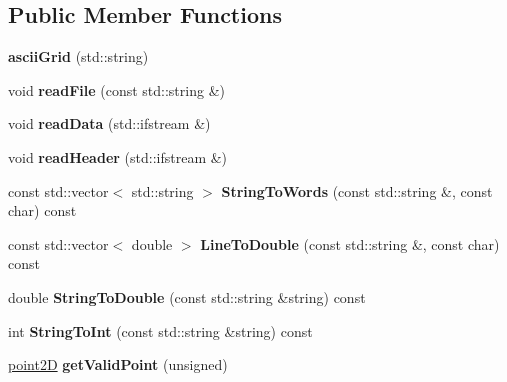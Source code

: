 \subsection*{Public Member Functions}
\begin{DoxyCompactItemize}
\item 
\mbox{\label{classasciiGrid_af8550fe183b2826823cab513878dcc8d}} 
{\bfseries ascii\+Grid} (std\+::string)
\item 
\mbox{\label{classasciiGrid_af009652a3b09761f42af9b6a9510aca7}} 
void {\bfseries read\+File} (const std\+::string \&)
\item 
\mbox{\label{classasciiGrid_a3f76f212cbd1eafd58da22623d49f44c}} 
void {\bfseries read\+Data} (std\+::ifstream \&)
\item 
\mbox{\label{classasciiGrid_aa8f140d48bc75fd0cb54c2e092ae81a6}} 
void {\bfseries read\+Header} (std\+::ifstream \&)
\item 
\mbox{\label{classasciiGrid_a9d4130b7ef3a98f9ece49cdf03f63849}} 
const std\+::vector$<$ std\+::string $>$ {\bfseries String\+To\+Words} (const std\+::string \&, const char) const
\item 
\mbox{\label{classasciiGrid_ace6a959d265f1f6da26f1aaf5721efe5}} 
const std\+::vector$<$ double $>$ {\bfseries Line\+To\+Double} (const std\+::string \&, const char) const
\item 
\mbox{\label{classasciiGrid_a0ec01a9678211fe765761a9c144a99f7}} 
double {\bfseries String\+To\+Double} (const std\+::string \&string) const
\item 
\mbox{\label{classasciiGrid_aea0714b6499575ddadc02f5ab0a918c5}} 
int {\bfseries String\+To\+Int} (const std\+::string \&string) const
\item 
\mbox{\label{classasciiGrid_ac9d2e6796db7a7e0498965b4052e35db}} 
\mbox{\hyperlink{classpoint2D}{point2D}} {\bfseries get\+Valid\+Point} (unsigned)
\item 
\mbox{\label{classasciiGrid_a340a0d2b319b7d3870d600a11394dfb8}} 

\end{DoxyCompactItemize}
